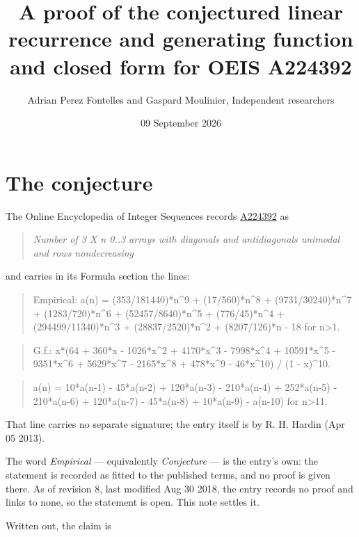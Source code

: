 \documentclass[11pt]{article}
\title{A proof of the conjectured linear recurrence and generating function and closed form for OEIS A224392}
\author{Adrian Perez Fontelles and Gaspard Moulinier, Independent researchers}
\date{09 September 2026}
\theoremstyle{definition}
\begin{document}
\maketitle
\section{The conjecture}

The Online Encyclopedia of Integer Sequences records \href{https://oeis.org/A224392}{A224392} as

\begin{quote}\itshape Number of 3 X n 0..3 arrays with diagonals and antidiagonals unimodal and rows nondecreasing\end{quote}

and carries in its Formula section the lines:

\begin{quote}\ttfamily Empirical: a(n) = (353/181440)*n\textasciicircum{}9 + (17/560)*n\textasciicircum{}8 + (9731/30240)*n\textasciicircum{}7 + (1283/720)*n\textasciicircum{}6 + (52457/8640)*n\textasciicircum{}5 + (776/45)*n\textasciicircum{}4 + (294499/11340)*n\textasciicircum{}3 + (28837/2520)*n\textasciicircum{}2 + (8207/126)*n - 18 for n>1.\end{quote}

\begin{quote}\ttfamily G.f.: x*(64 + 360*x - 1026*x\textasciicircum{}2 + 4170*x\textasciicircum{}3 - 7998*x\textasciicircum{}4 + 10591*x\textasciicircum{}5 - 9351*x\textasciicircum{}6 + 5629*x\textasciicircum{}7 - 2165*x\textasciicircum{}8 + 478*x\textasciicircum{}9 - 46*x\textasciicircum{}10) / (1 - x)\textasciicircum{}10.\end{quote}

\begin{quote}\ttfamily a(n) = 10*a(n-1) - 45*a(n-2) + 120*a(n-3) - 210*a(n-4) + 252*a(n-5) - 210*a(n-6) + 120*a(n-7) - 45*a(n-8) + 10*a(n-9) - a(n-10) for n>11.\end{quote}

That line carries no separate signature; the entry itself is by R. H. Hardin (Apr 05 2013).

The word {\itshape Empirical} --- equivalently {\itshape Conjecture} --- is the entry's own: the statement is recorded as fitted to the published terms, and no proof is given there. As of revision 8, last modified Aug 30 2018, the entry records no proof and links to none, so the statement is open. This note settles it.

Written out, the claim is
\end{document}
